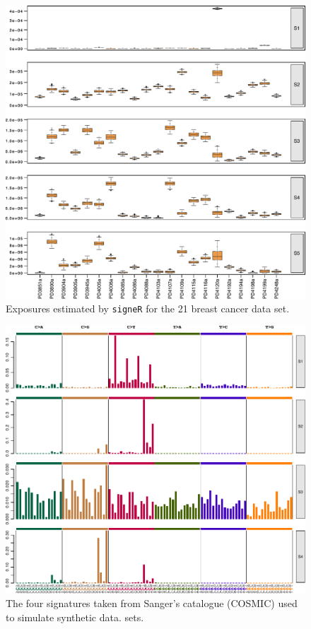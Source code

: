 \documentclass[11pt]{amsart}
\theoremstyle{definition}
\begin{document}
\begin{center}
\begin{figure}
  \includegraphics[width=16cm]
     {sfigs/Exposure_boxplot_simulated_21bc_com_Opp}
  \caption{Exposures estimated by \texttt{signeR} for the  21 breast
     cancer data set.}\label{fig:21BCExposures}
\end{figure}
\end{center}

\begin{center}
\begin{figure}
  \includegraphics[width=16cm]{sfigs/Signature_standard_Cosmic_plot}
  \caption{The four signatures taken from Sanger's catalogue (COSMIC) used to simulate synthetic data.
    sets.}\label{fig:COSMIC}
\end{figure}
\end{center}
\end{document}
